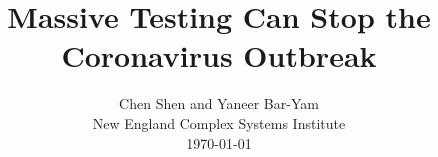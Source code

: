 \documentclass[onecolumn,journal]{IEEEtran}
\begin{document}
\title{\color{Brown}  Massive Testing Can Stop the Coronavirus Outbreak \\
\vspace{-0.35ex}}
\author{Chen Shen and Yaneer Bar-Yam \\ New England Complex Systems Institute \\
 \today 
  \vspace{-8ex} \\ 
\textbf{}
 }
    
\maketitle




\thispagestyle{empty} %





\end{document}
